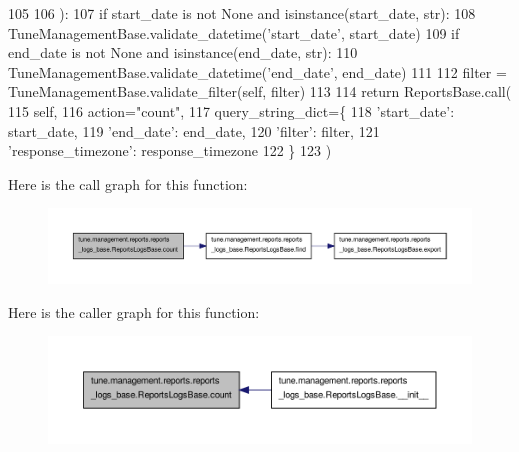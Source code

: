 \begin{DoxyCode}
105 
106     ):
107         \textcolor{keywordflow}{if} start\_date \textcolor{keywordflow}{is} \textcolor{keywordflow}{not} \textcolor{keywordtype}{None} \textcolor{keywordflow}{and} isinstance(start\_date, str):
108             TuneManagementBase.validate\_datetime(\textcolor{stringliteral}{'start\_date'}, start\_date)
109         \textcolor{keywordflow}{if} end\_date \textcolor{keywordflow}{is} \textcolor{keywordflow}{not} \textcolor{keywordtype}{None} \textcolor{keywordflow}{and} isinstance(end\_date, str):
110             TuneManagementBase.validate\_datetime(\textcolor{stringliteral}{'end\_date'}, end\_date)
111 
112         filter = TuneManagementBase.validate\_filter(self, filter)
113 
114         \textcolor{keywordflow}{return} ReportsBase.call(
115             self,
116             action=\textcolor{stringliteral}{"count"},
117             query\_string\_dict=\{
118                 \textcolor{stringliteral}{'start\_date'}: start\_date,
119                 \textcolor{stringliteral}{'end\_date'}: end\_date,
120                 \textcolor{stringliteral}{'filter'}: filter,
121                 \textcolor{stringliteral}{'response\_timezone'}: response\_timezone
122             \}
123         )

\end{DoxyCode}


Here is the call graph for this function\-:
\nopagebreak
\begin{figure}[H]
\begin{center}
\leavevmode
\includegraphics[width=350pt]{classtune_1_1management_1_1reports_1_1reports__logs__base_1_1ReportsLogsBase_aed75ad9c6fddb320f4a4dff10d988730_cgraph}
\end{center}
\end{figure}




Here is the caller graph for this function\-:
\nopagebreak
\begin{figure}[H]
\begin{center}
\leavevmode
\includegraphics[width=350pt]{classtune_1_1management_1_1reports_1_1reports__logs__base_1_1ReportsLogsBase_aed75ad9c6fddb320f4a4dff10d988730_icgraph}
\end{center}
\end{figure}


